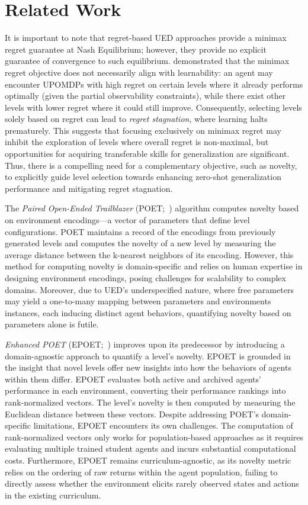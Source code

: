 \section{Related Work}
\label{section:related_works}
It is important to note that regret-based UED approaches provide a minimax regret guarantee at Nash Equilibrium; however, they provide no explicit guarantee of convergence to such equilibrium. \citet{beukman2024Refining} demonstrated that the minimax regret objective does not necessarily align with learnability: an agent may encounter UPOMDPs with high regret on certain levels where it already performs optimally (given the partial observability constraints), while there exist other levels with lower regret where it could still improve. Consequently, selecting levels solely based on regret can lead to {\em regret stagnation}, where learning halts prematurely. This suggests that focusing exclusively on minimax regret may inhibit the exploration of levels where overall regret is non-maximal, but opportunities for acquiring transferable skills for generalization are significant. Thus, there is a compelling need for a complementary objective, such as novelty, to explicitly guide level selection towards enhancing zero-shot generalization performance and mitigating regret stagnation.

The {\em Paired Open-Ended Trailblazer} (POET;~\cite{wang2019poet}) algorithm computes novelty based on environment encodings---a vector of parameters that define level configurations. POET maintains a record of the encodings from previously generated levels and computes the novelty of a new level by measuring the average distance between the k-nearest neighbors of its encoding. However, this method for computing novelty is domain-specific and relies on human expertise in designing environment encodings, posing challenges for scalability to complex domains. Moreover, due to UED's underspecified nature, where free parameters may yield a one-to-many mapping between parameters and environments instances, each inducing distinct agent behaviors, quantifying novelty based on parameters alone is futile. 

{\em Enhanced POET} (EPOET;~\cite{wang2020enhanced}) improves upon its predecessor by introducing a domain-agnostic approach to quantify a level's novelty. EPOET is grounded in the insight that novel levels offer new insights into how the behaviors of agents within them differ. EPOET evaluates both active and archived agents' performance in each environment, converting their performance rankings into rank-normalized vectors. The level's novelty is then computed by measuring the Euclidean distance between these vectors. Despite addressing POET's domain-specific limitations, EPOET encounters its own challenges. The computation of rank-normalized vectors only works for population-based approaches as it requires evaluating multiple trained student agents and incurs substantial computational costs. Furthermore, EPOET remains curriculum-agnostic, as its novelty metric relies on the ordering of raw returns within the agent population, failing to directly assess whether the environment elicits rarely observed states and actions in the existing curriculum.

